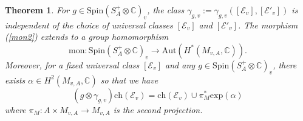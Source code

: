 \documentclass[11pt]{amsart}
\theoremstyle{plain}
\newtheorem{thm}{Theorem}[section]
\theoremstyle{definition}
\theoremstyle{remark}
\newcommand{\BC}{{\mathbb{C}}}
\newcommand{\CE}{{\mathcal E}}
\begin{document}
\begin{thm}\label{monodromy_main} 
For $g \in \mathrm{Spin}(S_A^+\otimes\BC)_v$,
the class $\gamma_{g,v}:= \gamma_{g,v}([\CE_v],[\CE'_v])$ is independent of the choice of universal classes $[\CE_v]$ and $[\CE'_v]$.
The morphism (\ref{mon2}) extends to a group homomorphism
\[
 \mathrm{mon}:  \mathrm{Spin}(S_A^+ \otimes \BC)_v \to \mathrm{Aut}(H^*(M_{v,A}, \BC)).
\]
 Moreover, for a fixed universal class $[\CE_v]$ and any $g \in \mathrm{Spin}(S_A^+ \otimes \BC)_v$, there exists
$\alpha \in H^2(M_{v,A}, \BC)$ 
so that we have
\begin{equation}\label{univ_fam}
(g\otimes \gamma_{g,v}) \mathrm{ch}(\CE_v) = \mathrm{ch}({\CE}_v)\cup \pi_M^* \mathrm{exp}(\alpha)
\end{equation}
where $\pi_M: A\times M_{v,A} \to M_{v,A}$ is the second projection.
\end{thm}
\end{document}
